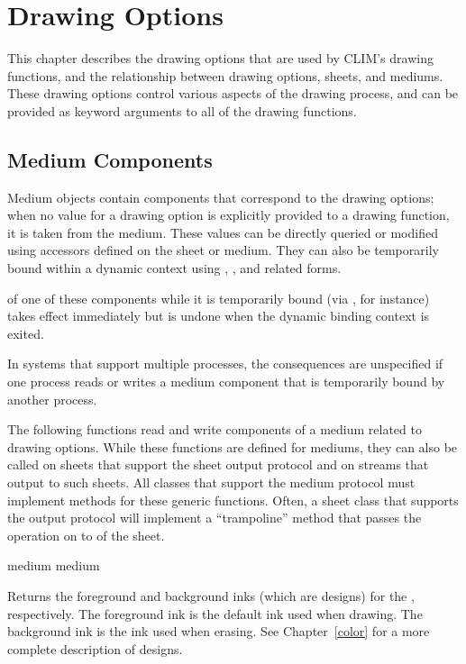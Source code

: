 
\chapter {Drawing Options}
\label {drawing-options}

This chapter describes the drawing options that are used by CLIM's drawing
functions, and the relationship between drawing options, sheets, and mediums.
These drawing options control various aspects of the drawing process, and can be
provided as keyword arguments to all of the drawing functions.


\section {Medium Components}

Medium objects contain components that correspond to the drawing options; when
no value for a drawing option is explicitly provided to a drawing function, it
is taken from the medium.  These values can be directly queried or modified
using accessors defined on the sheet or medium.  They can also be temporarily
bound within a dynamic context using ,
, and related forms.

 of one of these components while it is temporarily bound (via
, for instance) takes effect immediately but is undone
when the dynamic binding context is exited.

In systems that support multiple processes, the consequences are unspecified if
one process reads or writes a medium component that is temporarily bound by
another process.

The following functions read and write components of a medium related to drawing
options.  While these functions are defined for mediums, they can also be called
on sheets that support the sheet output protocol and on streams that output to such
sheets.  All classes that support the medium protocol must implement methods for
these generic functions.  Often, a sheet class that supports the output protocol
will implement a ``trampoline'' method that passes the operation on to
 of the sheet.


 {medium}
 {medium}

Returns the foreground and background inks (which are designs) for the
 , respectively.  The foreground ink is the default ink
used when drawing.  The background ink is the ink used when erasing.  See
Chapter~\ref{color} for a more complete description of designs.

